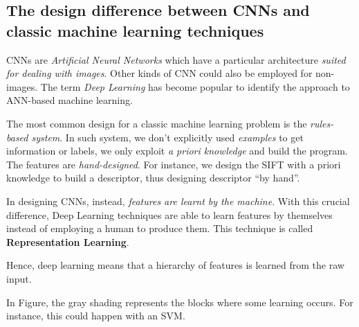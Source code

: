 \documentclass[10pt]{report}
\begin{document}
\subsection{The design difference between CNNs and classic machine learning techniques}
\label{sec:orgd20d4d5}

CNNs are \emph{Artificial Neural Networks} which have a particular
architecture \emph{suited for dealing with images}. Other kinds of CNN could
also be employed for non-images. The term \emph{Deep Learning} has become
popular to identify the approach to ANN-based machine learning.

The most common design for a classic machine learning problem is the
\emph{rules-based system}. In such system, we don't explicitly used
\emph{examples} to get information or labels, we only exploit \emph{a priori
knowledge} and build the program. The features are \emph{hand-designed}. For
instance, we design the SIFT with a priori knowledge to build a
descriptor, thus designing descriptor ``by hand''.

In designing CNNs, instead, \emph{features are learnt by the machine}. With
this crucial difference, Deep Learning techniques are able to learn
features by themselves instead of employing a human to produce them.
This technique is called \textbf{Representation Learning}.

Hence, deep learning means that a hierarchy of features is learned from
the raw input.

In Figure, the gray shading represents the blocks where some learning
occurs. For instance, this could happen with an SVM.
\end{document}
